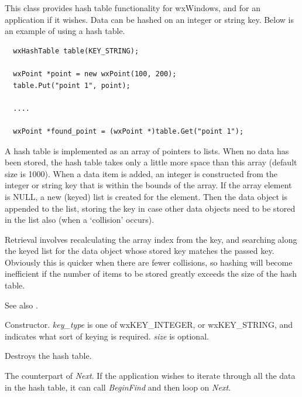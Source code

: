 This class provides hash table functionality for wxWindows, and for an
application if it wishes.  Data can be hashed on an integer or string
key.  Below is an example of using a hash table.

\begin{verbatim}
  wxHashTable table(KEY_STRING);

  wxPoint *point = new wxPoint(100, 200);
  table.Put("point 1", point);

  ....

  wxPoint *found_point = (wxPoint *)table.Get("point 1");
\end{verbatim}

A hash table is implemented as an array of pointers to lists. When no
data has been stored, the hash table takes only a little more space than
this array (default size is 1000).  When a data item is added, an
integer is constructed from the integer or string key that is within the
bounds of the array. If the array element is NULL, a new (keyed) list is
created for the element. Then the data object is appended to the list,
storing the key in case other data objects need to be stored in the list
also (when a `collision' occurs).

Retrieval involves recalculating the array index from the key, and searching
along the keyed list for the data object whose stored key matches the passed
key. Obviously this is quicker when there are fewer collisions, so hashing
will become inefficient if the number of items to be stored greatly exceeds
the size of the hash table.

See also .



Constructor. {\it key\_type} is one of wxKEY\_INTEGER, or wxKEY\_STRING,
and indicates what sort of keying is required. {\it size} is optional.



Destroys the hash table.



The counterpart of {\it Next}.  If the application wishes to iterate
through all the data in the hash table, it can call {\it BeginFind} and
then loop on {\it Next}.

